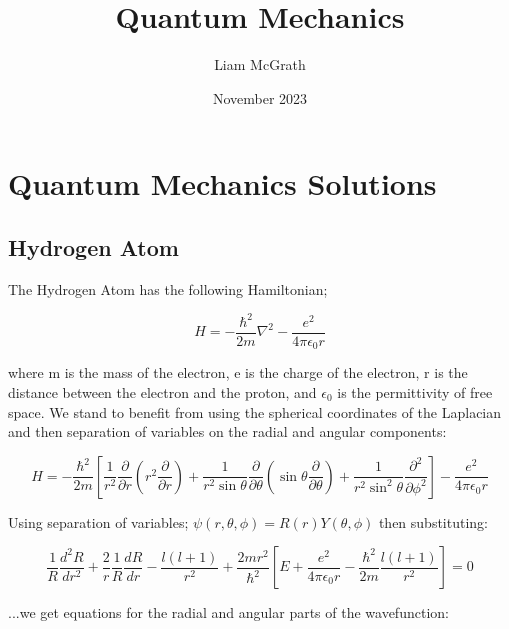\documentclass{article}
\title{Quantum Mechanics}
\author{Liam McGrath}
\date{November 2023}
\begin{document}
\maketitle

\section{Quantum Mechanics Solutions}

\subsection{Hydrogen Atom}

The Hydrogen Atom has the following Hamiltonian;

\begin{equation}
H = -\frac{\hbar^2}{2m}\nabla^2 - \frac{e^2}{4\pi\epsilon_0r}
\end{equation}

where m is the mass of the electron, e is the charge of the electron, r is the distance between the electron and the proton, and \begin{math} \epsilon_0 \end{math} is the permittivity of free space. We stand to benefit from using the spherical coordinates of the Laplacian and then separation of variables on the radial and angular components:

\begin{equation}
H = -\frac{\hbar^2}{2m}\left[\frac{1}{r^2}\frac{\partial}{\partial r}\left(r^2\frac{\partial}{\partial r}\right) + \frac{1}{r^2\sin\theta}\frac{\partial}{\partial\theta}\left(\sin\theta\frac{\partial}{\partial\theta}\right) + \frac{1}{r^2\sin^2\theta}\frac{\partial^2}{\partial\phi^2}\right] - \frac{e^2}{4\pi\epsilon_0r}
\end{equation}

Using separation of variables; \begin{math} \psi(r,\theta,\phi) = R(r)Y(\theta,\phi) \end{math} then substituting:

\begin{equation}
\frac{1}{R}\frac{d^2R}{dr^2} + \frac{2}{r}\frac{1}{R}\frac{dR}{dr} - \frac{l(l+1)}{r^2} + \frac{2mr^2}{\hbar^2}\left[E + \frac{e^2}{4\pi\epsilon_0r} - \frac{\hbar^2}{2m}\frac{l(l+1)}{r^2}\right] = 0
\end{equation}

...we get equations for the radial and angular parts of the wavefunction:
\end{document}
